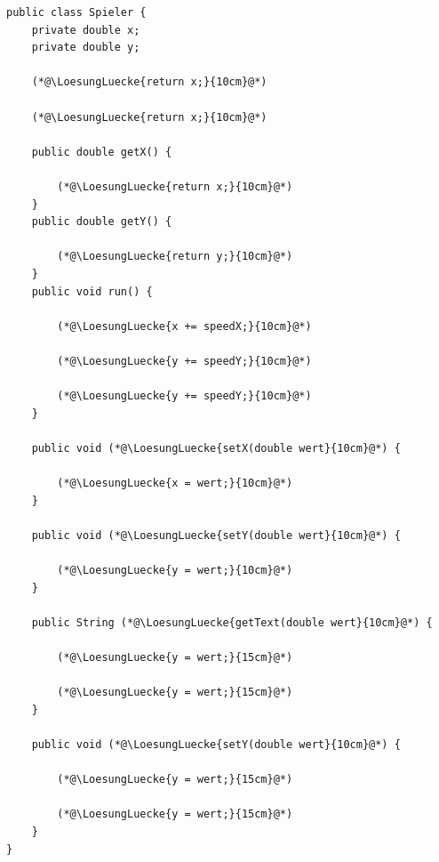 \large
\begin{lstlisting}
public class Spieler {
    private double x;
    private double y;

    (*@\LoesungLuecke{return x;}{10cm}@*)

    (*@\LoesungLuecke{return x;}{10cm}@*)
    
    public double getX() {
    
        (*@\LoesungLuecke{return x;}{10cm}@*)
    }
    public double getY() {
    
        (*@\LoesungLuecke{return y;}{10cm}@*)
    }
    public void run() {
    
        (*@\LoesungLuecke{x += speedX;}{10cm}@*)
        
        (*@\LoesungLuecke{y += speedY;}{10cm}@*)
        
        (*@\LoesungLuecke{y += speedY;}{10cm}@*)
    }
    
    public void (*@\LoesungLuecke{setX(double wert}{10cm}@*) {
    
        (*@\LoesungLuecke{x = wert;}{10cm}@*)
    }
    
    public void (*@\LoesungLuecke{setY(double wert}{10cm}@*) {
    
        (*@\LoesungLuecke{y = wert;}{10cm}@*)
    }
    
    public String (*@\LoesungLuecke{getText(double wert}{10cm}@*) {
    
        (*@\LoesungLuecke{y = wert;}{15cm}@*)
        
        (*@\LoesungLuecke{y = wert;}{15cm}@*)
    }
    
    public void (*@\LoesungLuecke{setY(double wert}{10cm}@*) {
    
        (*@\LoesungLuecke{y = wert;}{15cm}@*)
        
        (*@\LoesungLuecke{y = wert;}{15cm}@*)
    }
}
\end{lstlisting}